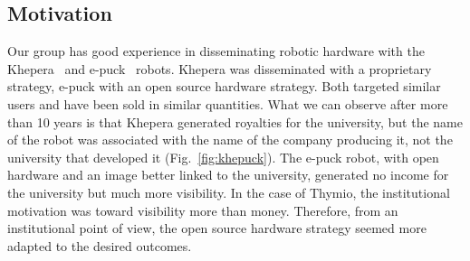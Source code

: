 \documentclass[letterpaper, 10 pt, conference]{ieeeconf}  %
\begin{document}
\subsection{Motivation}

Our group has good experience in disseminating robotic hardware with the Khepera~\cite{MonFraIen93} and e-puck~\cite{mondada2009puck} robots.
Khepera was disseminated with a proprietary strategy, e-puck with an open source hardware strategy.
Both targeted similar users and have been sold in similar quantities.
What we can observe after more than 10 years is that Khepera generated royalties for the university, but the name of the robot was associated with the name of the company producing it, not the university that developed it (Fig.~\ref{fig:khepuck}).
The e-puck robot, with open hardware and an image better linked to the university, generated no income for the university but much more visibility.
In the case of Thymio, the institutional motivation was toward visibility more than money. 
Therefore, from an institutional point of view, the open source hardware strategy seemed more adapted to the desired outcomes.
\end{document}

